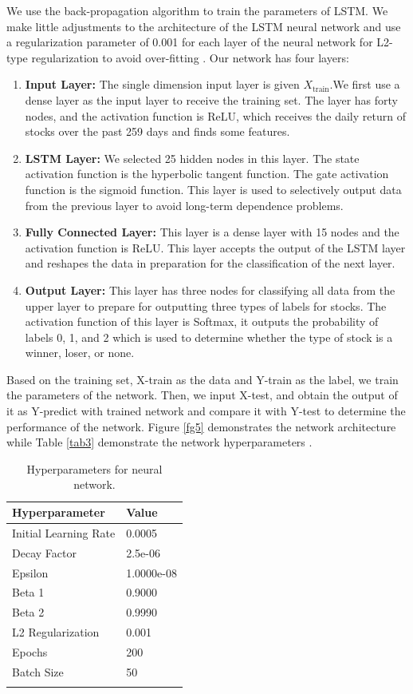 \documentclass[default,iicol]{sn-jnl}%
\begin{document}
We use the back-propagation algorithm to train the parameters of LSTM. We make little adjustments to the architecture of the LSTM neural network and use a regularization parameter of 0.001 for each layer of the neural network for L2-type regularization to avoid over-fitting \cite{2009L2}. Our network has four layers:
\begin{enumerate}
	\item \textbf{Input Layer:} The single dimension input layer is given $X_{\text{train}}$.We first use a dense layer as the input layer to receive the training set. The layer has forty nodes, and the activation function is ReLU, which receives the daily return of stocks over the past 259 days and finds some features.
	\item \textbf{LSTM Layer:} We selected 25 hidden nodes in this layer. The state activation function is the hyperbolic tangent function. The gate activation function is the sigmoid function. This layer is used to selectively output data from the previous layer to avoid long-term dependence problems.
	\item \textbf{Fully Connected Layer:} This layer is a dense layer with 15 nodes and the activation function is ReLU. This layer accepts the output of the LSTM layer and reshapes the data in preparation for the classification of the next layer.
	\item \textbf{Output Layer:} This layer has three nodes for classifying all data from the upper layer to prepare for outputting three types of labels for stocks. The activation function of this layer is Softmax, it outputs the probability of labels 0, 1, and 2 which is used to determine whether the type of stock is a winner, loser, or none.
\end{enumerate}

Based on the training set, X-train as the data and Y-train as the label, we train the parameters of the network. Then, we input X-test, and obtain the output of it as Y-predict with trained network and compare it with Y-test to determine the performance of the network. Figure \ref{fg5} demonstrates the network architecture while Table \eqref{tab3} demonstrate the network hyperparameters \cite{smith2018dont}.
\begin{table}[htbp]
	\renewcommand{\arraystretch}{1.25}
	\centering
	\begin{tabular}{@{}ll@{}}
		\toprule
		\textbf{Hyperparameter} & \textbf{Value} \\ 
		\midrule
		Initial Learning Rate  &  0.0005 \\
		Decay Factor &  2.5e-06\\
		Epsilon     & 1.0000e-08\\
		Beta 1 &  0.9000 \\ 
		Beta 2 & 0.9990 \\
		L2 Regularization & 0.001\\
		Epochs & 200 \\
		Batch Size &  50\\
		\botrule
	\end{tabular}
	\caption{Hyperparameters for neural network. }
	\label{tab3}
\end{table}
\end{document}
